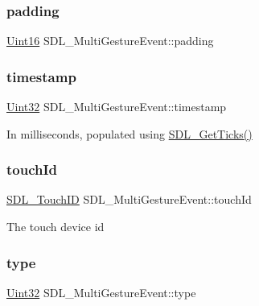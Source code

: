 \subsubsection{\texorpdfstring{padding}{padding}}
{\footnotesize\ttfamily \mbox{\hyperlink{_s_d_l__stdinc_8h_a31fcc0a076c9068668173ee26d33e42b}{Uint16}} S\+D\+L\+\_\+\+Multi\+Gesture\+Event\+::padding}

\mbox{\label{struct_s_d_l___multi_gesture_event_a7e99a98debf3ce11f6d2a2fbb3637175}} 
\subsubsection{\texorpdfstring{timestamp}{timestamp}}
{\footnotesize\ttfamily \mbox{\hyperlink{_s_d_l__stdinc_8h_add440eff171ea5f55cb00c4a9ab8672d}{Uint32}} S\+D\+L\+\_\+\+Multi\+Gesture\+Event\+::timestamp}

In milliseconds, populated using \mbox{\hyperlink{_s_d_l__timer_8h_a0b9bc71d6287e0ffafdc3419760fe2b3}{S\+D\+L\+\_\+\+Get\+Ticks()}} \mbox{\label{struct_s_d_l___multi_gesture_event_aa15d1201559a3c9277082af71a972dc1}} 
\subsubsection{\texorpdfstring{touchId}{touchId}}
{\footnotesize\ttfamily \mbox{\hyperlink{_s_d_l__touch_8h_a10f5f86abe4ea8308a8706bd5d3b337a}{S\+D\+L\+\_\+\+Touch\+ID}} S\+D\+L\+\_\+\+Multi\+Gesture\+Event\+::touch\+Id}

The touch device id \mbox{\label{struct_s_d_l___multi_gesture_event_ab0c7adc9a3f71cc3532bfe0ff8cc6120}} 
\subsubsection{\texorpdfstring{type}{type}}
{\footnotesize\ttfamily \mbox{\hyperlink{_s_d_l__stdinc_8h_add440eff171ea5f55cb00c4a9ab8672d}{Uint32}} S\+D\+L\+\_\+\+Multi\+Gesture\+Event\+::type}

